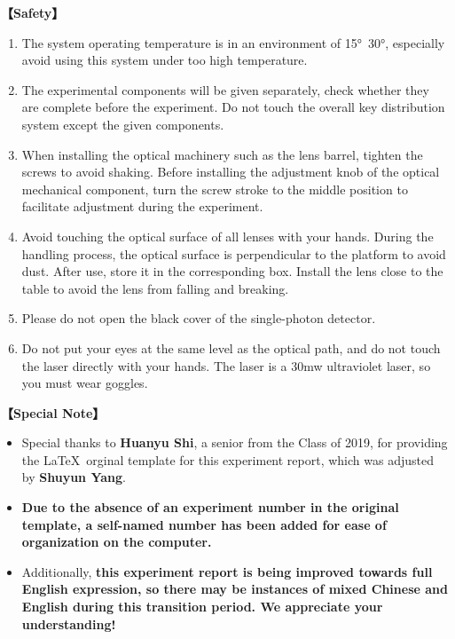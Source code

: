 \textbf{【Safety】}	
\begin{enumerate}
	\item The system operating temperature is in an environment of 15°~30°, especially avoid using this system under too high temperature.
	\item The experimental components will be given separately, check whether they are complete before the experiment. Do not touch the overall key distribution system except the given components.
	\item When installing the optical machinery such as the lens barrel, tighten the screws to avoid shaking. Before installing the adjustment knob of the optical mechanical component, turn the screw stroke to the middle position to facilitate adjustment during the experiment.
	\item Avoid touching the optical surface of all lenses with your hands. During the handling process, the optical surface is perpendicular to the platform to avoid dust. After use, store it in the corresponding box. Install the lens close to the table to avoid the lens from falling and breaking.
	\item \textcolor{fred}{Please do not open the black cover of the single-photon detector.}
	\item \textcolor{fred}{Do not put your eyes at the same level as the optical path, and do not touch the laser directly with your hands. The laser is a 30mw ultraviolet laser, so you must wear goggles.}
\end{enumerate}	
	
	
\textbf{【Special Note】}	
\begin{itemize}
	\item Special thanks to \textbf{Huanyu Shi}, a senior from the Class of 2019, for providing the \LaTeX \ orginal template for this experiment report, which was adjusted by \textbf{Shuyun Yang}. 
	
	\item \textbf{Due to the absence of an experiment number in the original template, a self-named number has been added for ease of organization on the computer.} 
	
	\item Additionally, \textcolor{fred}{\large\textbf{this experiment report is being improved towards full English expression, so there may be instances of mixed Chinese and English during this transition period. We appreciate your understanding!}}
\end{itemize}


\clearpage
\tableofcontents		